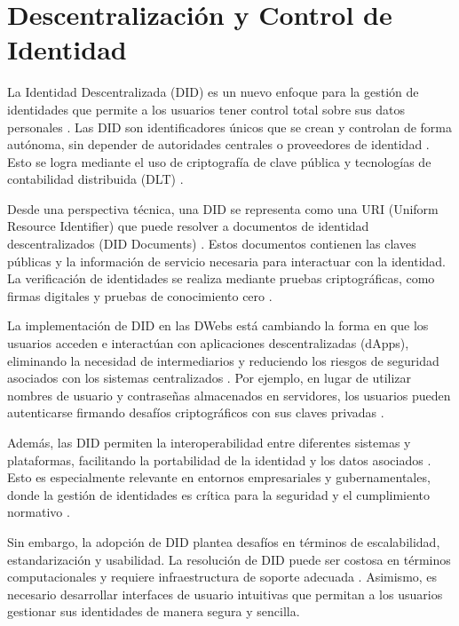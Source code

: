 \section{Descentralización y Control de Identidad}

La Identidad Descentralizada (DID) es un nuevo enfoque para la gestión de identidades que permite a los usuarios tener control total sobre sus datos personales \cite{w3cdid}. Las DID son identificadores únicos que se crean y controlan de forma autónoma, sin depender de autoridades centrales o proveedores de identidad \cite{preukschat2020self}. Esto se logra mediante el uso de criptografía de clave pública y tecnologías de contabilidad distribuida (DLT) \cite{allen2017decentralized}.

Desde una perspectiva técnica, una DID se representa como una URI (Uniform Resource Identifier) que puede resolver a documentos de identidad descentralizados (DID Documents) \cite{sporny2019did}. Estos documentos contienen las claves públicas y la información de servicio necesaria para interactuar con la identidad. La verificación de identidades se realiza mediante pruebas criptográficas, como firmas digitales y pruebas de conocimiento cero \cite{baldimtsi2013anonymous}.

La implementación de DID en las DWebs está cambiando la forma en que los usuarios acceden e interactúan con aplicaciones descentralizadas (dApps), eliminando la necesidad de intermediarios y reduciendo los riesgos de seguridad asociados con los sistemas centralizados \cite{tozny2017decentralized}. Por ejemplo, en lugar de utilizar nombres de usuario y contraseñas almacenados en servidores, los usuarios pueden autenticarse firmando desafíos criptográficos con sus claves privadas \cite{rivest1978method}.

Además, las DID permiten la interoperabilidad entre diferentes sistemas y plataformas, facilitando la portabilidad de la identidad y los datos asociados \cite{reed2016dkms}. Esto es especialmente relevante en entornos empresariales y gubernamentales, donde la gestión de identidades es crítica para la seguridad y el cumplimiento normativo \cite{cameron2005laws}.

Sin embargo, la adopción de DID plantea desafíos en términos de escalabilidad, estandarización y usabilidad. La resolución de DID puede ser costosa en términos computacionales y requiere infraestructura de soporte adecuada \cite{paul2018blockchain}. Asimismo, es necesario desarrollar interfaces de usuario intuitivas que permitan a los usuarios gestionar sus identidades de manera segura y sencilla.

